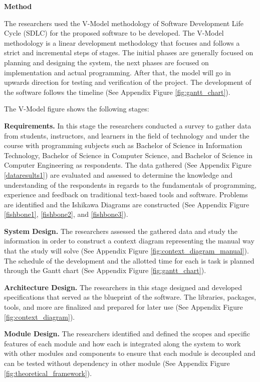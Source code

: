 \flushleft
\textbf{Method}\\
\justifying

\parx
The researchers used the V-Model methodology of Software
Development Life Cycle (SDLC) for the proposed software to be developed. The
V-Model methodology is a linear development methodology that focuses and follows
a strict and incremental steps of stages. The initial phases are generally
focused on planning and designing the system, the next phases are focused on
implementation and actual programming. After that, the model will go in upwards
direction for testing and verification of the project. The development of the
software follows the timeline (See Appendix Figure \ref{fig:gantt_chart}).

\parx
The V-Model figure shows the following stages:

\flushleft
\textbf{Requirements.}
\justifying
\parx
In this stage the researchers conducted a survey to gather data from
students, instructors, and learners in the field of technology and under the
course with programming subjects such as Bachelor of Science in Information
Technology, Bachelor of Science in Computer Science, and Bachelor of Science in
Computer Engineering as respondents. The data gathered
(See Appendix Figure \ref{dataresults1})
are evaluated and assessed to determine the knowledge and understanding of
the respondents in regards to the fundamentals of programming, experience and
feedback on traditional text-based tools and software. Problems are identified
and the Ishikawa Diagrams are constructed
(See Appendix Figure \ref{fishbone1}, \ref{fishbone2}, and
\ref{fishbone3}).

\flushleft
\textbf{System Design.}
\justifying
The researchers assessed the gathered data and study the information in order
to construct a context diagram representing the manual way that the study will
solve (See Appendix Figure \ref{fig:context_diagram_manual}). The schedule of the
development and the allotted time for each is task is planned through the Gantt
chart (See Appendix Figure \ref{fig:gantt_chart}).

\flushleft
\textbf{Architecture Design.}
\justifying
\parx
The researchers in this stage designed and developed specifications that served
as the blueprint of the software. The libraries, packages, tools, and more are
finalized and prepared for later use (See Appendix Figure
\ref{fig:context_diagram}).

\flushleft
\textbf{Module Design.}
\justifying
\parx
The researchers identified and defined the scopes and specific features of
each module and how each is integrated along the system to work with other
modules and components to ensure that each module is decoupled and can be tested
without dependency in other module
(See Appendix Figure \ref{fig:theoretical_framework}).

